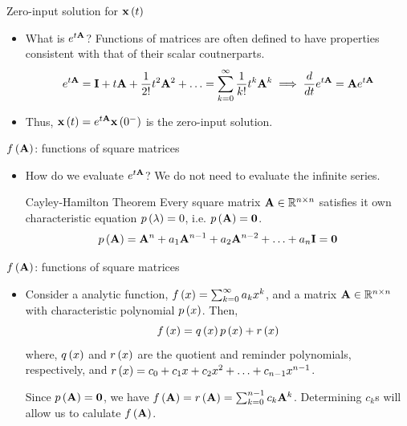 \documentclass[aspectratio=169]{beamer}
\def\mf{\ensuremath\mathbf}
\def\mb{\ensuremath\mathbb}
\def\lp{\ensuremath\left(}
\def\rp{\ensuremath\right)}
\newcommand{\ct}[1]{\lp #1\rp}
\begin{document}
\begin{frame}[t]{Zero-input solution for $\mf{x}\ct{t}$}
\begin{itemize}
    \item What is $e^{t\mf{A}}$? Functions of matrices are often defined to have properties consistent with that of their scalar coutnerparts. 
     \[ e^{t\mf{A}} = \mf{I} + t\mf{A} + \frac{1}{2!}t^2\mf{A}^2 + \ldots = \sum_{k=0}^{\infty} \frac{1}{k!}t^k\mf{A}^k \implies \frac{d}{dt}e^{t\mf{A}} = \mf{A}e^{t\mf{A}} \]

   \item Thus, $\mf{x}\ct{t} = e^{t\mf{A}}\mf{x}\ct{0^-}$ is the zero-input solution.
\end{itemize}
\end{frame}


\begin{frame}[t]{$f\lp\mf{A}\rp$: functions of square matrices}
\begin{itemize}
    \item How do we evaluate $e^{t\mf{A}}$? We do not need to evaluate the infinite series.

    \begin{bclogo}{Cayley-Hamilton Theorem}
    Every square matrix $\mf{A} \in \mb{R}^{n \times n}$ satisfies it own characteristic equation $p\lp \lambda \rp = 0$, i.e. $p\lp\mf{A}\rp = \mf{0}$.
    \[ p\lp\mf{A}\rp = \mf{A}^n + a_1\mf{A}^{n-1} + a_2\mf{A}^{n-2} + \ldots + a_n\mf{I} = \mf{0} \]
    \end{bclogo}
\end{itemize}
\end{frame}


\begin{frame}[t]{$f\lp\mf{A}\rp$: functions of square matrices}
\begin{itemize}
    \item Consider a analytic function, $f\lp x\rp = \sum_{k=0}^\infty a_kx^k$, and a matrix $\mf{A} \in \mb{R}^{n \times n}$ with characteristic polynomial $p\lp x\rp$. Then,
    \[ f\lp x\rp = q\lp x\rp p\lp x\rp + r\lp x\rp \]
    where, $q\lp x\rp$ and $r\lp x\rp$ are the quotient and reminder polynomials, respectively, and $r\lp x\rp = c_0 + c_1x + c_2x^2 + \ldots + c_{n-1}x^{n-1}$.

    Since $p\lp \mf{A}\rp = \mf{0}$, we have $f\lp \mf{A}\rp = r\lp \mf{A}\rp = \sum_{k=0}^{n-1}c_k\mf{A}^k$. Determining $c_k$s will allow us to calulate $f\lp \mf{A}\rp$.
\end{itemize}
\end{frame}
\end{document}
